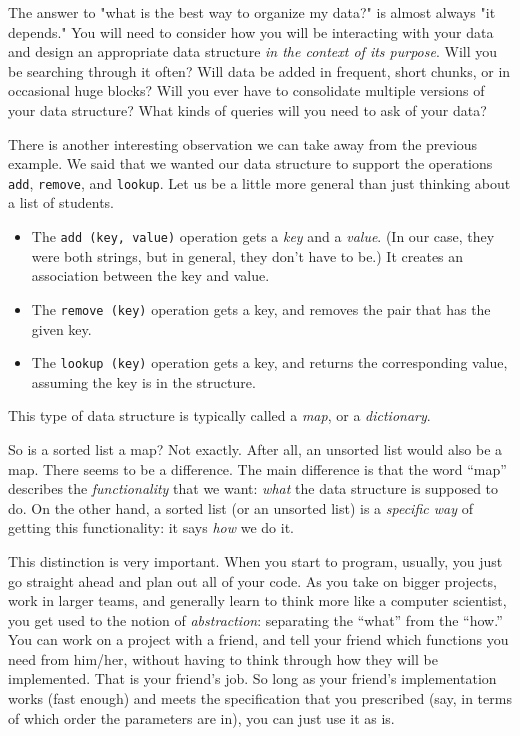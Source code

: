 The answer to "what is the best way to organize my data?" is almost always "it depends."
You will need to consider how you will be interacting with your data and design an appropriate data structure \emph{in the context of its purpose}. 
Will you be searching through it often?
Will data be added in frequent, short chunks, or in occasional huge blocks?
Will you ever have to consolidate multiple versions of your data structure?
What kinds of queries will you need to ask of your data?

\medskip

There is another interesting observation we can take away from the previous
example. We said that we wanted our data structure to support
the operations \texttt{add}, \texttt{remove}, and \texttt{lookup}.
Let us be a little more general than just thinking about a list of students.
\begin{itemize}
\item The \texttt{add (key, value)} operation gets a \emph{key} and a
  \emph{value}. (In our case, they were both strings, but in general,
  they don't have to be.)
  It creates an association between the key and value.
\item The \texttt{remove (key)} operation gets a key, and removes the
  pair that has the given key.
\item The \texttt{lookup (key)} operation gets a key, and returns the
  corresponding value, assuming the key is in the structure.
\end{itemize}
This type of data structure is typically called a \emph{map},
or a \emph{dictionary}.

So is a sorted list a map? Not exactly.
After all, an unsorted list would also be a map.
There seems to be a difference.
The main difference is that the word ``map'' describes the
\emph{functionality} that we want:
\emph{what} the data structure is supposed to do.
On the other hand, a sorted list (or an unsorted list) is a
\emph{specific way} of getting this functionality:
it says \emph{how} we do it. 

This distinction is very important. When you start to program,
usually, you just go straight ahead and plan out all of your code.
As you take on bigger projects, work in larger teams, and generally
learn to think more like a computer scientist, you get used to the 
notion of \emph{abstraction}: separating the ``what'' from the ``how.''
You can work on a project with a friend, and tell your friend
which functions you need from him/her, without having to think through
how they will be implemented. That is your friend's job.
So long as your friend's implementation works (fast enough) and meets
the specification that you prescribed (say, in terms of which order
the parameters are in), you can just use it as is.

